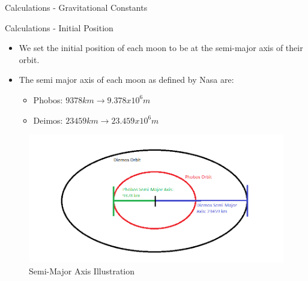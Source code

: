 \documentclass{beamer}  %
\begin{document}
\begin{frame}{Calculations - Gravitational Constants}


 \end{frame}

\begin{frame}{Calculations - Initial Position}

\begin{itemize}
\item We set the initial position of each moon to be at the semi-major axis of their orbit.
\item The semi major axis of each moon as defined by Nasa are:
\begin{itemize}
	\item Phobos: $9378km \rightarrow 9.378 x 10^6m$
	\item Deimos: $23459km \rightarrow 23.459 x 10^6m$
\end{itemize}
\end{itemize}

\begin{figure}
\label{fig:2}
\caption{Semi-Major Axis Illustration}
\includegraphics[scale=0.45]{semi-majorAxis}

\end{figure}


 \end{frame}
\end{document}
